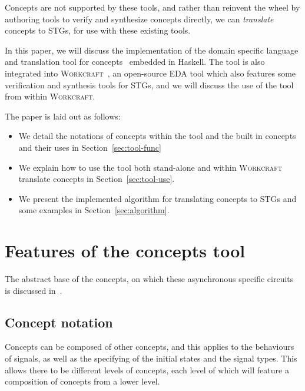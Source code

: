 \documentclass[british,conference,compsoc]{IEEEtran}
\newcommand{\noun}[1]{\textsc{#1}}
\begin{document}
Concepts are not supported by these tools, and rather than reinvent the wheel by
authoring tools to verify and synthesize concepts directly, we can 
\emph{translate} concepts to STGs, for use with these existing tools.

In this paper, we will discuss the implementation of the domain specific 
language and translation tool for concepts~\cite{2016_concepts_github} embedded 
in Haskell. The tool is also integrated into 
\noun{Workcraft}~\cite{Workcraft_website}, an open-source EDA tool which also
features some verification and synthesis tools for STGs, and we will discuss 
the use of the tool from within \noun{Workcraft}.

The paper is laid out as follows:
\vspace{-6mm}
\begin{itemize}
  \item We detail the notations of concepts within the tool and the built in
  concepts and their uses in Section~\ref{sec:tool-func}
  \item We explain how to use the tool both stand-alone and within
  \noun{Workcraft} translate concepts in Section~\ref{sec:tool-use}.
  \item We present the implemented algorithm for translating concepts to STGs
  and some examples in Section~\ref{sec:algorithm}.
\end{itemize}


\section{Features of the concepts tool\label{sec:tool-func}}


The abstract base of the concepts, on which these asynchronous specific circuits
is discussed in~\cite{2015_Beaumont_MEMOCODE}.

\subsection{Concept notation \label{sub:concept-notation}}

Concepts can be composed of other concepts, and this applies to the behaviours 
of signals, as well as the specifying of the initial states and the signal 
types. This allows there to be different levels of concepts, each level of 
which will feature a composition of concepts from a lower level. 
\end{document}
